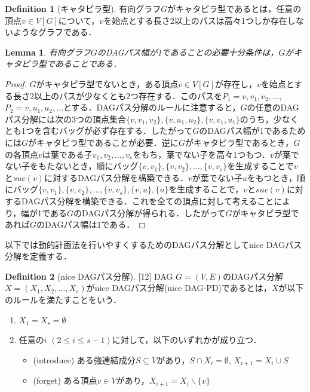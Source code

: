\documentclass[master]{kuisthesis}		%
\theoremstyle{plain}
\newtheorem{lemma}{Lemma}
\theoremstyle{definition}
\newtheorem{definition*}{Definition}
\begin{document}
\begin{definition*}[キャタピラ型]
    有向グラフ$G$がキャタピラ型であるとは，任意の頂点$v \in V[G]$について，$v$を始点とする長さ2以上のパスは高々1つしか存在しないようなグラフである．
\end{definition*}

\begin{lemma}\label{catapillar}
    有向グラフ$G$のDAGパス幅が1であることの必要十分条件は，$G$がキャタピラ型であることである．
\end{lemma}
    

\begin{proof}
    $G$がキャタピラ型でないとき，ある頂点$v\in V[G]$が存在し，$v$を始点とする長さ2以上のパスが少なくとも2つ存在する．このパスを$P_1 = v, v_1, v_2, \dots$, $P_2 = v, u_1, u_2, \dots$とする．DAGパス分解のルールに注意すると，$G$の任意のDAGパス分解には次の3つの頂点集合$\{v, v_1, v_2\}, \{v, u_1, u_2\}, \{v, v_1, u_1\}$のうち，少なくとも1つを含むバッグが必ず存在する．したがって$G$のDAGパス幅が1であるためには$G$がキャタピラ型であることが必要．逆に$G$がキャタピラ型であるとき，$G$の各頂点$v$は葉である子$v_1, v_2, \dots, v_s$をもち，葉でない子を高々1つもつ．$v$が葉でない子をもたないとき，順にバッグ$\{v, v_1\}, \{v, v_2\}, \dots , \{v, v_s\}$を生成することで$v$と$suc(v)$に対するDAGパス分解を構築できる．$v$が葉でない子$u$をもつとき，順にバッグ$\{v, v_1\}, \{v, v_2\}, \dots , \{v, v_s\}, \{v, u\}, \{u\}$を生成することで，$v$と$suc(v)$に対するDAGパス分解を構築できる．これを全ての頂点に対して考えることにより，幅が1である$G$のDAGパス分解が得られる．したがって$G$がキャタピラ型であれば$G$のDAGパス幅は1である．
\end{proof}




以下では動的計画法を行いやすくするためのDAGパス分解としてnice DAGパス分解を定義する．

\begin{definition*}[nice DAGパス分解][12]
    DAG $G=(V, E)$のDAGパス分解$X=(X_1, X_2,  \dots, X_s)$がnice DAGパス分解(nice DAG-PD)であるとは，$X$が以下のルールを満たすことをいう．
    
    \begin{enumerate}
        \item $X_1 = X_s = \emptyset$
        \item 任意の$i$ $(2 \leq i \leq s-1)$に対して，以下のいずれかが成り立つ．
        \begin{itemize}
            \item (introduce) ある強連結成分$S \subseteq V$があり，$S \cap X_i = \emptyset$, $X_{i+1} = X_i \cup S$
            \item (forget) ある頂点$v \in V$があり，$X_{i+1} = X_i \backslash \{v\}$
        \end{itemize}
    \end{enumerate}

\end{definition*}
\end{document}
